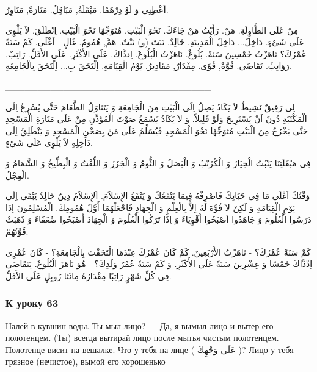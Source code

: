 \documentclass[a5paper]{article}
\begin{document}
اَعْطِِنِى وَ لَوْ دِرْهَمًا. مَبْقَلَةٌ, مَبَاقِلُ. مَنَارَةٌ, مَنَاوِرُ. 

مِنْ عَلَى الطَّاوِلَةِ. مَنْ. رَأَيْتُ مَنْ جَاءَكَ. نَحْوَ الْبَيْتِ. مُتَوَجِّهًا نَحْوَ الْبَيْتِ. اِنْطَلَقَ. لاَ يَلْوِى عَلَى شَىْءٍ. دَاخِلَ... دَاخِلَ الْمَدِينَةِ. خَالِدٌ. نَبَتَ (و) نَبْتٌ. هَمَّ, هُمُومٌ. غَالٍ - اَغْلَى. كَمْ سَنَةً عُمْرُكَ؟ نَاهَزْتُ خَمْسِينَ سَنَةً. بُلُوغٌ. نَاهَزْتُ الْبُلُوغَ. اِذذَّاكَ. عَلَى الأَكْثَرِ. عَلَى الأَقَلِّ. رَاتِبٌ, رَوَاتِبُ. تَقَاضَى. قُوَّةٌ, قُوًى. مِقْدَارٌ, مَقَادِيرُ. يَوْمُ الْقِيَامَةِ. اِلْتَحَقَ بِ... اِلْتَحَقَ بِالْجَامِعَةِ.

\_\_\_\_\_\_\_\_\_\_\_\_\_\_\_\_\_\_\_\_\_\_\_\_\_\_\_\_\_\_\_\_

لِى رَفِيقٌ نَشِيطٌ لاَ يَكَادُ يَصِلُ اِلَى الْبَيْتِ مِنَ الْجَامِعَةِ وَ يَتَنَاوَلُ الطَّعَامَ حَتَّى يُسْرِعُ اِلَى الْمَكْتَبَةِ دُونَ اَنْ يَسْتَرِيحَ وَلَوْ قَلِيلاً. وَ لاَ يَكَادُ يَسْمَعُ صَوْتَ الْمُؤَذِّنِ مِنْ عَلَى مَنَارَةِ الْمَسْجِدِ حَتَّى يَخْرُجُ مِنَ الْبَيْتِ مُتَوَجِّهًا نَحْوَ الْمَسْجِدِ فَيُسَلِّمُ عَلَى مَنْ بِصَحْنِ الْمَسْجِدِ وَ يَنْطَلِقُ اِلَى دَاخِلِهِ لاَ يَلْوِى عَلَى شَىْءٍ.

فِى مَبْقَلَتِنَا يَنْبُتُ الْخِيَارُ وَ الْكُرُنْبُ وَ الْبَصَلُ وَ الثُّومُ وَ الْجَزَرُ وَ اللِّفْتُ وَ الْبِطِّيخُ وَ الشَّمَامُ وَ الْفِجْلُ.

وَقْتُكَ اَغْلَى مَا فِى حَيَاتِكَ فَاصْرِفْهُ فِيمَا يَنْفَعُكَ وَ يَنْفَعُ الإِسْلاَمَ. اَلإِسْلاَمُ دِينٌ خَالِدٌ يَبْقَى اِلَى يَوْمِ الْقِيَامَةِ وَ لَكِنْ لاَ قُوَّةَ لَهُ اِلاَّ بِالْعِلْمِ وَ الْجِهَادِ فَاجْعَلْهُمَا أَوَّلَ هُمُومِكَ. الْمُسْلِمُونَ اِذَا دَرَسُوا الْعُلُومَ وَ جَاهَدُوا اَصْبَحُوا أَقْوِيَاءَ وَ اِذَا تَرَكُوا الْعُلُومَ وَ الْجِهَادَ أَصْبَحُوا ضُعَفَاءَ وَ ذَهَبَتْ قُوَّتُهُمْ.

كَمْ سَنَةً عُمْرُكَ؟ - نَاهَزْتُ الأَرْبَعِينَ. كَمْ كَانَ عُمْرُكَ عِنْدَمَا الْتَحَقْتَ بِالْجَامِعَةِ؟ - كَانَ عُمْرِى اِذْذَّاكَ خَمْسًا وَ عِشْرِينَ سَنَةً عَلَى الأَكْثَرِ. وَ كَمْ سَنَةً عُمْرُ وَلَدِكَ؟ - هُوَ نَاهَزَ الْبُلُوغَ. يَتَقَاضَى فِى كُلِّ شَهْرٍ رَاتِبًا مِقْدَارُهُ مِائَتَا رُوبِلٍ عَلَى الأَقَلِّ.

\subsubsection{К уроку 63}
Налей в кувшин воды. Ты мыл лицо? — Да, я вымыл лицо и вытер его полотенцем. (Ты) всегда вытирай лицо после мытья чистым полотенцем. Полотенце висит на вешалке. Что у тебя на лице ( عَلَى وَجْهِكَ )? Лицо у тебя грязное (нечистое), вымой его хорошенько
\end{document}

